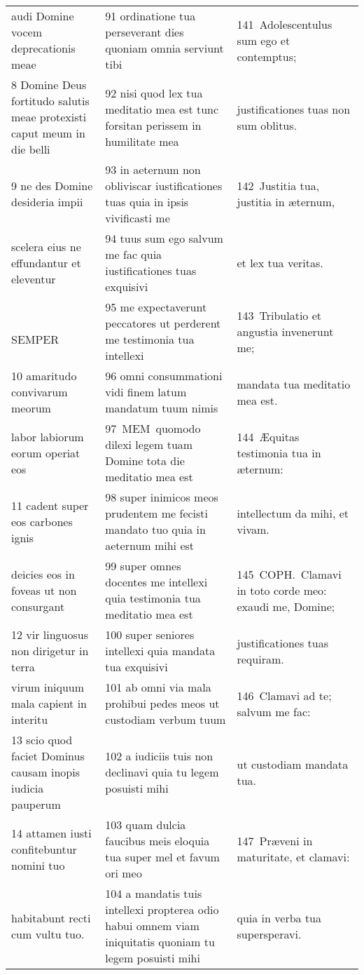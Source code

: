 \documentclass{article}
\begin{document}
\begin{longtable}{@{}p{}p{}p{}@{}}
audi Domine vocem deprecationis meae	&	91 ordinatione tua perseverant dies quoniam omnia serviunt tibi	&	141 Adolescentulus sum ego et contemptus;	\\
8 Domine Deus fortitudo salutis meae protexisti caput meum in die belli	&	92 nisi quod lex tua meditatio mea est tunc forsitan perissem in humilitate mea	&	justificationes tuas non sum oblitus.	\\
9 ne des Domine desideria impii	&	93 in aeternum non obliviscar iustificationes tuas quia in ipsis vivificasti me	&	142 Justitia tua, justitia in æternum,	\\
scelera eius ne effundantur et eleventur	&	94 tuus sum ego salvum me fac quia iustificationes tuas exquisivi	&	et lex tua veritas.	\\
    SEMPER	&	95 me expectaverunt peccatores ut perderent me testimonia tua intellexi	&	143 Tribulatio et angustia invenerunt me;	\\
10 amaritudo convivarum meorum	&	96 omni consummationi vidi finem latum mandatum tuum nimis	&	mandata tua meditatio mea est.	\\
labor labiorum eorum operiat eos	&	97 MEM quomodo dilexi legem tuam Domine tota die meditatio mea est	&	144 Æquitas testimonia tua in æternum:	\\
11 cadent super eos carbones ignis	&	98 super inimicos meos prudentem me fecisti mandato tuo quia in aeternum mihi est	&	intellectum da mihi, et vivam.	\\
deicies eos in foveas ut non consurgant	&	99 super omnes docentes me intellexi quia testimonia tua meditatio mea est	&	145 COPH. Clamavi in toto corde meo: exaudi me, Domine;	\\
12 vir linguosus non dirigetur in terra	&	100 super seniores intellexi quia mandata tua exquisivi	&	justificationes tuas requiram.	\\
virum iniquum mala capient in interitu	&	101 ab omni via mala prohibui pedes meos ut custodiam verbum tuum	&	146 Clamavi ad te; salvum me fac:	\\
13 scio quod faciet Dominus causam inopis iudicia pauperum	&	102 a iudiciis tuis non declinavi quia tu legem posuisti mihi	&	ut custodiam mandata tua.	\\
14 attamen iusti confitebuntur nomini tuo	&	103 quam dulcia faucibus meis eloquia tua super mel et favum ori meo	&	147 Præveni in maturitate, et clamavi:	\\
habitabunt recti cum vultu tuo.	&	104 a mandatis tuis intellexi propterea odio habui omnem viam iniquitatis quoniam tu legem posuisti mihi	&	quia in verba tua supersperavi.	\\

\end{longtable}
\end{document}

